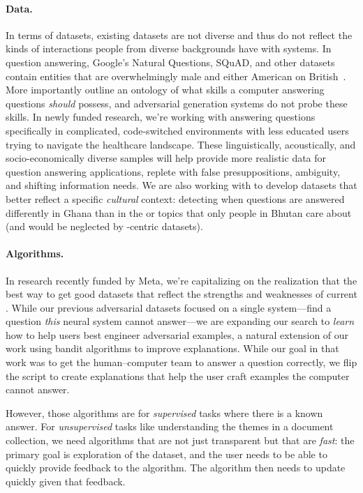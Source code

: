 \paragraph{Data.}
%
In terms of datasets, existing datasets are not diverse and thus do
not reflect the kinds of interactions people from diverse backgrounds
have with  systems.
%
In question answering, Google's Natural Questions, SQuAD, and other
datasets contain entities that are overwhelmingly male and either
American on British~\cite{gor-21}.
%
More importantly  outline an ontology of what
skills a computer answering questions \emph{should} possess, and
adversarial  generation systems do not probe these skills.
%
In newly funded  research, we're working with answering
questions specifically in complicated, code-switched environments with
less educated users trying to navigate the healthcare landscape.
%
These linguistically, acoustically, and socio-economically diverse
samples will help provide more realistic data for question answering
applications, replete with false presuppositions, ambiguity, and
shifting information needs.
%
We are also working with  to develop datasets that better
reflect a specific \emph{cultural} context: detecting when questions
are answered differently in Ghana than in the  or topics that
only people in Bhutan care about (and would be neglected by
-centric datasets).

\paragraph{Algorithms.} In research recently funded by Meta, we're capitalizing on
the realization that the best way to get good datasets that reflect
the strengths and weaknesses of current .
%
While our previous adversarial datasets focused on a single
system---find a question \emph{this} neural system cannot answer---we
are expanding our search to \emph{learn} how to help users best
engineer adversarial examples, a natural extension of our work using
bandit algorithms to improve explanations.
%
While our goal in that work was to get the human--computer team to
answer a question correctly, we flip the script to create explanations
that help the user craft examples the computer cannot answer.

However, those algorithms are for \emph{supervised} tasks where there
is a known answer.
%
For \emph{unsupervised} tasks like understanding the themes in a
document collection, we need algorithms
that are not just transparent but that are \emph{fast}: the primary
goal is exploration of the dataset, and the user needs to be able to
quickly provide feedback to the algorithm.
%
The algorithm then needs to update quickly given that feedback.

